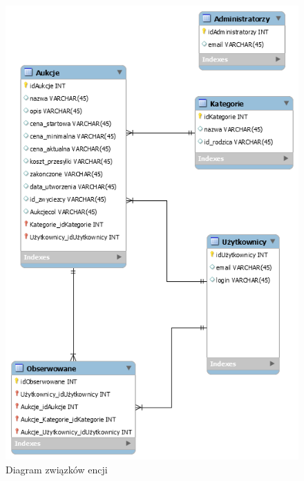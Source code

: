 \documentclass[brudnopis]{xmgr}
\begin{document}
\begin{figure}[!tbh]
\centering
\includegraphics[scale=0.4]{fig/erd}
\caption{Diagram związków encji\label{RYS.1}}
\end{figure}

\newpage
\end{document}
